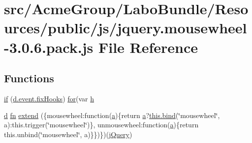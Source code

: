 \hypertarget{jquery_8mousewheel-3_80_86_8pack_8js}{\section{src/\+Acme\+Group/\+Labo\+Bundle/\+Resources/public/js/jquery.mousewheel-\/3.0.6.pack.\+js File Reference}
\label{jquery_8mousewheel-3_80_86_8pack_8js}
}
\subsection*{Functions}
\begin{DoxyCompactItemize}
\item 
\hyperlink{jquery_8mousewheel-3_80_86_8pack_8js_a06dc9c2ad00ed2dec5be547ade58569d}{if} (\hyperlink{jquery_8mousewheel-3_80_86_8pack_8js_a4b5c480977826b4df036a480ae718080}{d.\+event.\+fix\+Hooks}) \hyperlink{tinymce_8jquery_8dev_8js_a4675a875b20881bc5f7011f49fbd4da7}{for}(var \hyperlink{jquery_8mousewheel-3_80_86_8pack_8js_a5e36941b3d856737e81516acd45edc50}{h}
\item 
\hyperlink{fullpage_2plugin_8min_8js_a86138ad7596633fd5f960ad9c40f8862}{d} \hyperlink{jquery_8mobile-1_83_81_8js_a070a098c013c19f1fbe3cec06e21420f}{fn} \hyperlink{jquery_8mousewheel-3_80_86_8pack_8js_abd0c4439f7523dbb205b653b6b6b63a0}{extend} (\{mousewheel\+:function(\hyperlink{media_2js_2jquery_8js_aa4d4888597588a84fd5b1184d00c91f3}{a})\{return \hyperlink{media_2js_2jquery_8js_aa4d4888597588a84fd5b1184d00c91f3}{a}?\hyperlink{jquery_8mobile-1_83_81_8js_aa28c4555fcf1f84917a1d70644f7174f}{this.\+bind}(\char`\"{}mousewheel\char`\"{}, a)\+:this.\+trigger(\char`\"{}mousewheel\char`\"{})\}, unmousewheel\+:function(\hyperlink{media_2js_2jquery_8js_aa4d4888597588a84fd5b1184d00c91f3}{a})\{return this.\+unbind(\char`\"{}mousewheel\char`\"{}, a)\}\})\})(\hyperlink{_site_bundle_2_resources_2public_2js_2_specific_functions_8js_ada154f66b5b2b806f5e239376e925644}{j\+Query})
\end{DoxyCompactItemize}
